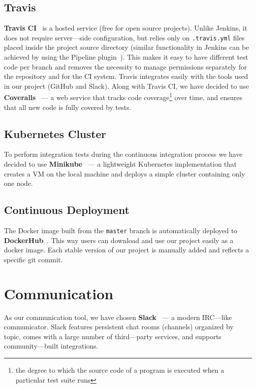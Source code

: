 \subsection{Travis}
\textbf{Travis CI}~\cite{travis} is a hosted service (free for open source projects). Unlike Jenkins, it does not require server---side configuration,
but relies only on \texttt{.travis.yml} files placed inside the project source directory (similar functionality in Jenkins can be achieved by using
the Pipeline plugin~\cite{jnk-pipeline}). This makes it easy to have different test code per branch and removes the necessity to manage permissions
separately for the repository and for the CI system. Travis integrates easily with the tools used in our project (GitHub and Slack). Along with
Travis CI, we have decided to use \textbf{Coveralls}~\cite{coveralls} --- a web service that tracks code coverage\footnote{the degree to which the
source code of a program is executed when a particular test suite runs} over time, and ensures that all new code is fully covered by tests.
\subsection{Kubernetes Cluster}
To perform integration tests during the continuous integration process we have decided to use \textbf{Minikube}~\cite{minikube} --- a lightweight
Kubernetes implementation that creates a VM on the local machine and deploys a simple cluster containing only one node.
\subsection{Continuous Deployment}
The Docker image built from the \texttt{master} branch is automatically deployed to \textbf{DockerHub}~\cite{docker}. This way users can download
and use our project easily as a docker image. Each stable version of our project is manually added and reflects a specific git commit.
\section{Communication}
As our communication tool, we have chosen \textbf{Slack}~\cite{slack} --- a modern IRC---like communicator. Slack features persistent chat rooms
(channels) organized by topic, comes with a large number of third---party services, and supports community---built integrations.